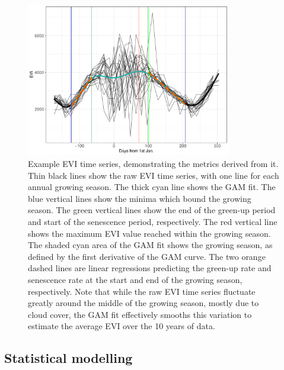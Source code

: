 \begin{refsection}
\begin{figure}[tb]
	\includegraphics[width=0.8\textwidth]{img/ts_example}
	\caption[Annotated EVI time series]{Example EVI time series, demonstrating the metrics derived from it. Thin black lines show the raw EVI time series, with one line for each annual growing season. The thick cyan line shows the GAM fit. The blue vertical lines show the minima which bound the growing season. The green vertical lines show the end of the green-up period and start of the senescence period, respectively. The red vertical line shows the maximum EVI value reached within the growing season. The shaded cyan area of the GAM fit shows the growing season, as defined by the first derivative of the GAM curve. The two orange dashed lines are linear regressions predicting the green-up rate and senescence rate at the start and end of the growing season, respectively. Note that while the raw EVI time series fluctuate greatly around the middle of the growing season, mostly due to cloud cover, the GAM fit effectively smooths this variation to estimate the average EVI over the 10 years of data.}
	\label{phen:ts_example}
\end{figure}

\subsection{Statistical modelling}
\label{phen:ssec:models}


\end{refsection}
